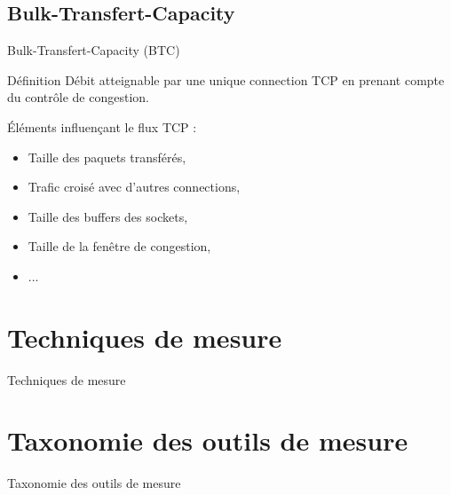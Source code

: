 \documentclass[compress]{beamer}
\begin{document}

\subsection{Bulk-Transfert-Capacity}
\begin{frame}{Bulk-Transfert-Capacity (BTC)}
	\begin{alertblock}{Définition}
		Débit atteignable par une unique connection TCP en prenant compte du contrôle de congestion.
	\end{alertblock}
	Éléments influençant le flux TCP : 
	\begin{itemize}
		\item Taille des paquets transférés,
		\item Trafic croisé avec d'autres connections,
		\item Taille des buffers des sockets,
		\item Taille de la fenêtre de congestion,
		\item ...
	\end{itemize}
\end{frame}


\section{Techniques de mesure}
\begin{frame}{Techniques de mesure}

\end{frame}

\section{Taxonomie des outils de mesure}
\begin{frame}{Taxonomie des outils de mesure}

\end{frame}
\end{document}
